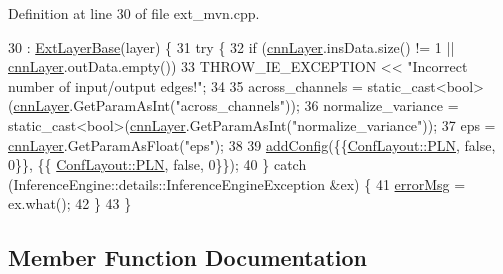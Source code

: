 Definition at line 30 of file ext\+\_\+mvn.\+cpp.


\begin{DoxyCode}
30                                            : \hyperlink{classInferenceEngine_1_1Extensions_1_1Cpu_1_1ExtLayerBase_affff0e8263ca26852ccf71d299d7b06a}{ExtLayerBase}(layer) \{
31         \textcolor{keywordflow}{try} \{
32             \textcolor{keywordflow}{if} (\hyperlink{classInferenceEngine_1_1Extensions_1_1Cpu_1_1ExtLayerBase_a1074cdccacb9e9ca6eec01bbc2f7ca4a}{cnnLayer}.insData.size() != 1 || \hyperlink{classInferenceEngine_1_1Extensions_1_1Cpu_1_1ExtLayerBase_a1074cdccacb9e9ca6eec01bbc2f7ca4a}{cnnLayer}.outData.empty())
33                 THROW\_IE\_EXCEPTION << \textcolor{stringliteral}{"Incorrect number of input/output edges!"};
34 
35             across\_channels = \textcolor{keyword}{static\_cast<}\textcolor{keywordtype}{bool}\textcolor{keyword}{>}(\hyperlink{classInferenceEngine_1_1Extensions_1_1Cpu_1_1ExtLayerBase_a1074cdccacb9e9ca6eec01bbc2f7ca4a}{cnnLayer}.GetParamAsInt(\textcolor{stringliteral}{"across\_channels"}));
36             normalize\_variance = \textcolor{keyword}{static\_cast<}\textcolor{keywordtype}{bool}\textcolor{keyword}{>}(\hyperlink{classInferenceEngine_1_1Extensions_1_1Cpu_1_1ExtLayerBase_a1074cdccacb9e9ca6eec01bbc2f7ca4a}{cnnLayer}.GetParamAsInt(\textcolor{stringliteral}{"normalize\_variance"}));
37             eps = \hyperlink{classInferenceEngine_1_1Extensions_1_1Cpu_1_1ExtLayerBase_a1074cdccacb9e9ca6eec01bbc2f7ca4a}{cnnLayer}.GetParamAsFloat(\textcolor{stringliteral}{"eps"});
38 
39             \hyperlink{classInferenceEngine_1_1Extensions_1_1Cpu_1_1ExtLayerBase_a0ac7a6632e95b9500d5246b05b4b0bfa}{addConfig}(\{\{\hyperlink{classInferenceEngine_1_1Extensions_1_1Cpu_1_1ExtLayerBase_a1258a8d209e0249e0b1717618352ddfba446687ea2db1ada75be5ed053be77f59}{ConfLayout::PLN}, \textcolor{keyword}{false}, 0\}\}, \{\{
      \hyperlink{classInferenceEngine_1_1Extensions_1_1Cpu_1_1ExtLayerBase_a1258a8d209e0249e0b1717618352ddfba446687ea2db1ada75be5ed053be77f59}{ConfLayout::PLN}, \textcolor{keyword}{false}, 0\}\});
40         \} \textcolor{keywordflow}{catch} (InferenceEngine::details::InferenceEngineException &ex) \{
41             \hyperlink{classInferenceEngine_1_1Extensions_1_1Cpu_1_1ExtLayerBase_abc78e9b5a79fa339ffd831a5318f71f7}{errorMsg} = ex.what();
42         \}
43     \}
\end{DoxyCode}


\subsection{Member Function Documentation}
